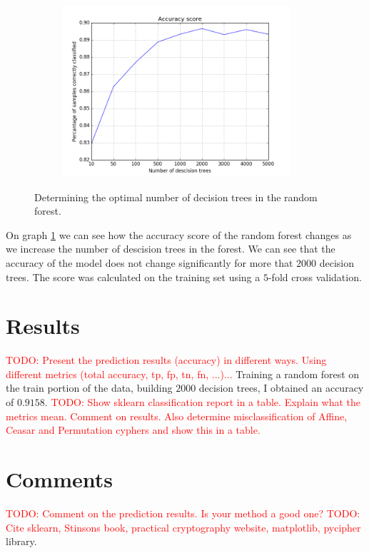 \documentclass[a4paper]{article}
\begin{document}
\begin{figure}[H]
    \centering
    \begin{subfigure}[h]{0.5\textwidth}
        \centering
        \includegraphics[height=2.5in]{img/accuracy_rf.png}
    \end{subfigure}
    \caption{Determining the optimal number of decision trees in the random forest.}
    \label{fig:acc_rf}
\end{figure}

On graph \ref{fig:acc_rf} we can see how the accuracy score of the random forest changes as we increase the number of descision trees in the forest. We can see that the accuracy of the model does not change significantly for more that $2000$ decision trees. The score was calculated on the training set using a $5$-fold cross validation. 

\section*{Results}
\textcolor{red}{TODO: Present the prediction results (accuracy) in different ways. Using different metrics (total accuracy, tp, fp, tn, fn, ...)...}
Training a random forest on the train portion of the data, building $2000$ decision trees, I obtained an accuracy of $0.9158$.
\textcolor{red}{TODO: Show sklearn classification report in a table. Explain what the metrics mean. Comment on results. Also determine misclassification of Affine, Ceasar and Permutation cyphers and show this in a table.}

\section*{Comments}
\textcolor{red}{TODO: Comment on the prediction results. Is your method a good one?}
\textcolor{red}{TODO: Cite sklearn, Stinsons book, practical cryptography website, matplotlib, pycipher} library.



\end{document}
